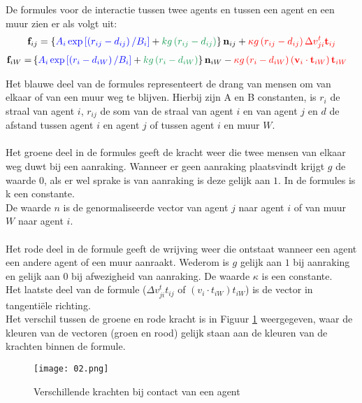 \documentclass[12pt, letterpaper]{article}
\begin{document}
De formules voor de interactie tussen twee agents en tussen een agent en een muur zien er als volgt uit:
\begin{equation}\label{eqagents}
\mathbf{f}_{i j}=\left\{ {\color{blue} A_{i} \exp \left[\left(r_{i j}-d_{i j}\right) / B_{i}\right]}+{\color{ForestGreen}k g\left(r_{i j}-d_{i j}\right)}\right\} \mathbf{n}_{i j}+{\color{red}\kappa g\left(r_{i j}-d_{i j}\right) \Delta v_{j i}^{t} \mathbf{t}_{i j}}
\end{equation}
\begin{equation}\label{eqmuur}
\begin{aligned}
\mathbf{f}_{i W}=&\left\{ {\color{blue}A_{i} \exp \left[\left(r_{i}-d_{i W}\right) / B_{i}\right]}+{\color{ForestGreen}k g\left(r_{i}-d_{i W}\right)}\right\} \mathbf{n}_{i W}-{\color{red}\kappa g\left(r_{i}-d_{i W}\right)\left(\mathbf{v}_{i} \cdot \mathbf{t}_{i W}\right) \mathbf{t}_{i W}}
\end{aligned}
\end{equation}

\noindent Het {\color{blue}blauwe deel} van de formules representeert de drang van mensen om van elkaar of van een muur weg te blijven. Hierbij zijn A en B constanten, is $r_i$ de straal van agent $i$, $r_{ij}$ de som van de straal van agent $i$ en van agent $j$ en $d$ de afstand tussen agent $i$ en agent $j$ of tussen agent $i$ en muur $W$.\\ \\
Het {\color{ForestGreen} groene deel} in de formules geeft de kracht weer die twee mensen van elkaar weg duwt bij een aanraking. Wanneer er geen aanraking plaatsvindt krijgt $g$ de waarde $0$, als er wel sprake is van aanraking is deze gelijk aan $1$. In de formules is k een constante. \\
De waarde $n$ is de genormaliseerde vector van agent $j$ naar agent $i$ of van muur $W$ naar agent $i$. \\ \\
Het {\color{red}rode deel} in de formule geeft de wrijving weer die ontstaat wanneer een agent een andere agent of een muur aanraakt. Wederom is $g$ gelijk aan $1$ bij aanraking en gelijk aan $0$ bij afwezigheid van aanraking. De waarde $\kappa$ is een constante.\\ Het laatste deel van de formule ($\Delta v_{j i}^{t} t_{i j}$ of $(v_{i} \cdot t_{i W}) t_{i W}$) is de vector in tangentiële richting. \\Het verschil tussen de groene en rode kracht is in Figuur \ref{krachten1} weergegeven, waar de kleuren van de vectoren (groen en rood) gelijk staan aan de kleuren van de krachten binnen de formule. 
\\
\begin{figure}[h]
\centering
\texttt{[image: 02.png]}
\caption{Verschillende krachten bij contact van een agent}
\label{krachten1}
\end{figure}
\end{document}
